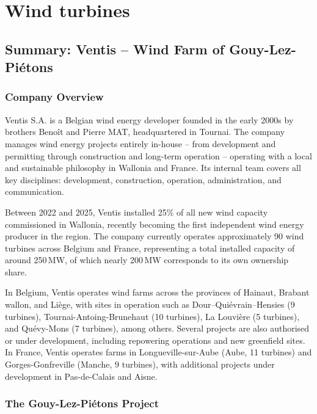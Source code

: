 \chapter{Wind turbines}


\section{Summary: Ventis -- Wind Farm of Gouy-Lez-Pi\'etons}

\subsection{Company Overview}

Ventis S.A. is a Belgian wind energy developer founded in the early 2000s by brothers Benoît
and Pierre MAT, headquartered in Tournai. The company manages wind energy projects entirely
in-house -- from development and permitting through construction and long-term operation --
operating with a local and sustainable philosophy in Wallonia and France. Its internal team
covers all key disciplines: development, construction, operation, administration, and
communication.

Between 2022 and 2025, Ventis installed 25\% of all new wind capacity commissioned in Wallonia,
recently becoming the first independent wind energy producer in the region. The company currently
operates approximately 90 wind turbines across Belgium and France, representing a total installed
capacity of around 250\,MW, of which nearly 200\,MW corresponds to its own ownership share.

In Belgium, Ventis operates wind farms across the provinces of Hainaut, Brabant wallon, and
Li\`ege, with sites in operation such as Dour--Qui\'evrain--Hensies (9 turbines),
Tournai-Antoing-Brunehaut (10 turbines), La Louvi\`ere (5 turbines), and Qu\'evy-Mons
(7 turbines), among others. Several projects are also authorised or under development,
including repowering operations and new greenfield sites. In France, Ventis operates farms
in Longueville-sur-Aube (Aube, 11 turbines) and Gorges-Gonfreville (Manche, 9 turbines),
with additional projects under development in Pas-de-Calais and Aisne.

\subsection{The Gouy-Lez-Pi\'etons Project}

